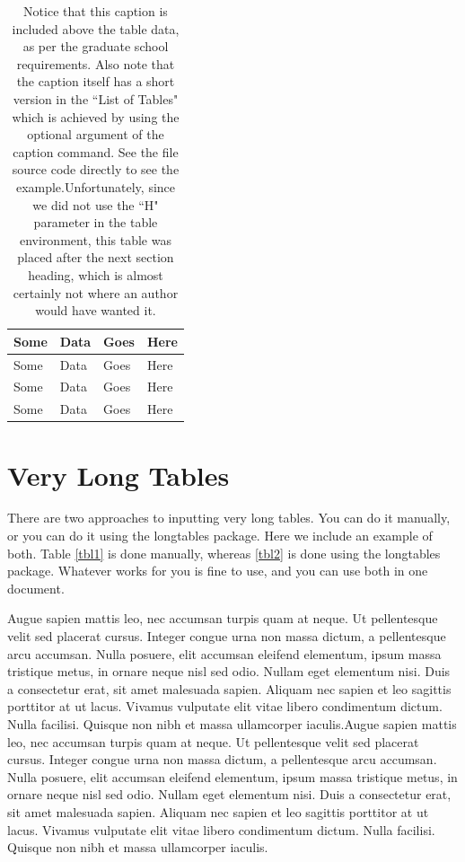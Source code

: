 \documentclass[../main.tex]{subfiles}
\begin{document}
\begin{table}[h]
\caption[A proper table caption location]{Notice that this caption is included above the table data, as per the graduate school requirements. Also note that the caption itself has a short version in the ``List of Tables" which is achieved by using the optional argument of the caption command. See the file source code directly to see the example.Unfortunately, since we did not use the ``H" parameter in the table environment, this table was placed after the next section heading, which is almost certainly not where an author would have wanted it.}
\begin{tabularx}{\textwidth}{XXXX}\hline
Some    & Data  & Goes  & Here\\\hline
Some    & Data  & Goes  & Here\\
Some    & Data  & Goes  & Here\\
Some    & Data  & Goes  & Here\\\hline
\end{tabularx}
\end{table}

\section{Very Long Tables}

There are two approaches to inputting very long tables. You can do it manually, or you can do it using the longtables package. Here we include an example of both. Table \ref{tbl1} is done manually, whereas \ref{tbl2} is done using the longtables package. Whatever works for you is fine to use, and you can use both in one document. 

Augue sapien mattis leo, nec accumsan turpis quam at neque. Ut pellentesque velit sed placerat cursus. Integer congue urna non massa dictum, a pellentesque arcu accumsan. Nulla posuere, elit accumsan eleifend elementum, ipsum massa tristique metus, in ornare neque nisl sed odio. Nullam eget elementum nisi. Duis a consectetur erat, sit amet malesuada sapien. Aliquam nec sapien et leo sagittis porttitor at ut lacus. Vivamus vulputate elit vitae libero condimentum dictum. Nulla facilisi. Quisque non nibh et massa ullamcorper iaculis.Augue sapien mattis leo, nec accumsan turpis quam at neque. Ut pellentesque velit sed placerat cursus. Integer congue urna non massa dictum, a pellentesque arcu accumsan. Nulla posuere, elit accumsan eleifend elementum, ipsum massa tristique metus, in ornare neque nisl sed odio. Nullam eget elementum nisi. Duis a consectetur erat, sit amet malesuada sapien. Aliquam nec sapien et leo sagittis porttitor at ut lacus. Vivamus vulputate elit vitae libero condimentum dictum. Nulla facilisi. Quisque non nibh et massa ullamcorper iaculis.
\end{document}
